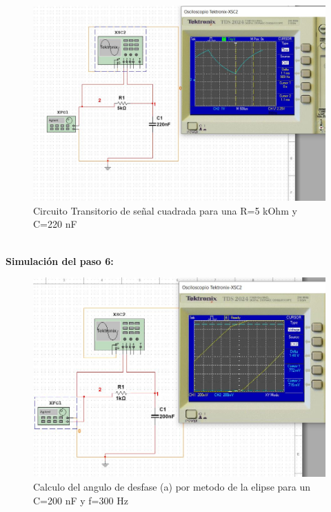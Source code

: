 \documentclass[twoside,twocolumn]{article}
\begin{document}
    \begin{figure}[h]
    \centering
    \includegraphics[scale=0.2]{Imagenes/4.3.JPG}
    \caption{Circuito Transitorio de señal cuadrada para una R=5 kOhm y C=220 nF}
    \label{fig:circuito1}
  \end{figure}\\   
\newpage
\textbf{Simulación del paso 6:}
  \begin{figure}[h]
    \centering
    \includegraphics[scale=0.2]{Imagenes/5.3.JPG}
    \caption{Calculo del angulo de desfase (a) por metodo de la elipse para un C=200 nF y f=300 Hz}
    \label{fig:circuito1}
  \end{figure}\\  
\end{document}
